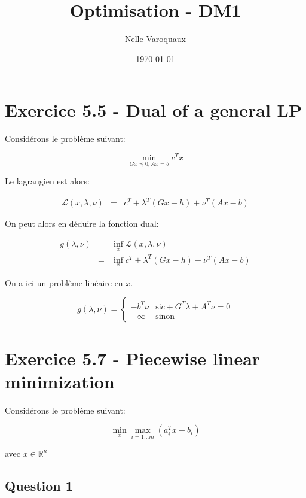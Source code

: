 \documentclass{article}
\date{\today}
\title{Optimisation - DM1}
\author{Nelle Varoquaux}
\begin{document}
\maketitle

\section{Exercice 5.5 - Dual of a general LP}

Considérons le problème suivant:

\begin{equation*}
\min_{G x \preccurlyeq 0; Ax = b} c^T x
\end{equation*}

Le lagrangien est alors:

\begin{align*}
\mathcal{L}(x, \lambda, \nu) & = & c^T+ \lambda^T (Gx - h) + \nu^T(Ax - b)
\end{align*}

On peut alors en déduire la fonction dual:

\begin{align*}
g(\lambda, \nu) & = & \inf_x \mathcal{L}(x, \lambda, \nu) \\
		& = & \inf_x c^T+ \lambda^T (Gx - h) + \nu^T(Ax - b)
\end{align*}

On a ici un problème linéaire en $x$.

\begin{equation*}
g(\lambda, \nu) = \begin{cases}
		  -b^T \nu & \mbox{si} c + G^T \lambda + A^T \nu = 0\\
		  - \infty & \mbox{sinon} 
		  \end{cases}
\end{equation*}

\section{Exercice 5.7 - Piecewise linear minimization}

Considérons le problème suivant:

\begin{equation}
\label{pbm_57}
\min_x \max_{i = 1 \dots m} (a_i^Tx + b_i)
\end{equation}

avec $x \in \mathbb{R}^n$

\subsection{Question 1}
\end{document}
